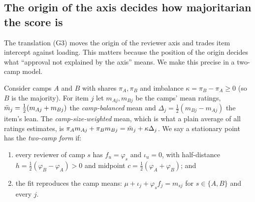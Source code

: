 \subsection{The origin of the axis decides how majoritarian the score is}

The translation (G3) moves the origin of the reviewer axis and trades item intercept against
loading. This matters because the position of the origin decides what ``approval not explained
by the axis'' means. We make this precise in a two-camp model.

Consider camps $A$ and $B$ with shares $\pi_A,\pi_B$ and imbalance
$\kappa=\pi_B-\pi_A\ge0$ (so $B$ is the majority). For item $j$ let $m_{Aj},m_{Bj}$ be the
camps' mean ratings, $\bar m_j=\tfrac12(m_{Aj}+m_{Bj})$ the \emph{camp-balanced} mean and
$\Delta_j=\tfrac12(m_{Bj}-m_{Aj})$ the item's lean. The \emph{camp-size-weighted} mean, which
is what a plain average of all ratings estimates, is $\pi_Am_{Aj}+\pi_Bm_{Bj}=\bar m_j+\kappa\Delta_j$.
We say a stationary point has the \emph{two-camp form} if:
\begin{enumerate}[label=(T\arabic*)]
  \item every reviewer of camp $s$ has $f_u=\varphi_s$ and $\iota_u=0$, with half-distance
    $h=\tfrac12(\varphi_B-\varphi_A)>0$ and midpoint $c=\tfrac12(\varphi_A+\varphi_B)$; and
  \item the fit reproduces the camp means: $\mu+\iota_j+\varphi_s f_j=m_{sj}$ for $s\in\{A,B\}$ and every $j$.
\end{enumerate}

